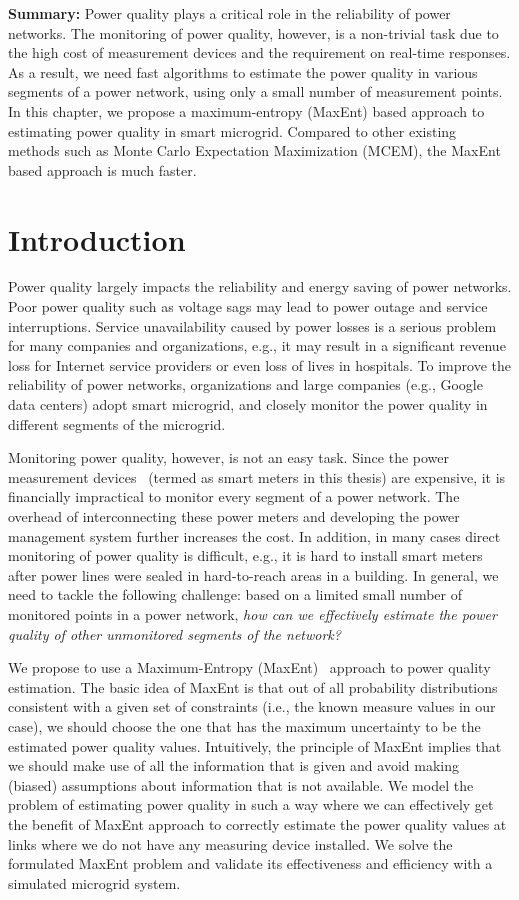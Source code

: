 \label{chap:PQEstimation}
\small
\textbf{Summary:} Power quality plays a critical role in the reliability of power networks. The monitoring of power quality, however, is a non-trivial task due to the high cost of measurement devices and the requirement on real-time responses. As a result, we need fast algorithms to estimate the power quality in various segments of a power network, using only a small number of measurement points. In this chapter, we propose a maximum-entropy (MaxEnt) based approach to estimating power quality in smart microgrid. Compared to other existing methods such as Monte Carlo Expectation Maximization (MCEM), the MaxEnt based approach is much faster.

\normalsize
\section{Introduction}
Power quality largely impacts the reliability and energy saving of power networks. Poor power quality such as voltage sags may lead to power outage and service interruptions. Service unavailability caused by power losses is a serious problem for many companies and organizations, e.g., it may result in a significant revenue loss for Internet service providers or even loss of lives in hospitals. To improve the reliability of power networks, organizations and large companies (e.g., Google data centers) adopt smart microgrid, and closely monitor the power quality in different segments of the microgrid.

Monitoring power quality, however, is not an easy task. Since the power measurement devices~\cite{fluke_meter}\cite{schneider_meter} (termed as smart meters in this thesis) are expensive, it is financially impractical to monitor every segment of a power network. The overhead of interconnecting these power meters and developing the power management system further increases the cost. In addition, in many cases direct monitoring of power quality is difficult, e.g., it is hard to install smart meters after power lines were sealed in hard-to-reach areas in a building. In general, we need to tackle the following challenge: based on a limited small number of monitored points in a power network, \textit{how can we effectively estimate the power quality of other unmonitored segments of the network?} 

We propose to use a Maximum-Entropy (MaxEnt)~\cite{maxent} approach to power quality estimation. The basic idea of MaxEnt is that out of all probability distributions consistent with a given set of constraints (i.e., the known measure values in our case), we should choose the one that has the maximum uncertainty to be the estimated power quality values. Intuitively, the principle of MaxEnt implies that we should make use of all the information that is given and avoid making (biased) assumptions about information that is not available. We model the problem of estimating power quality in such a way where we can effectively get the benefit of MaxEnt approach to correctly estimate the power quality values at links where we do not have any measuring device installed. We solve the formulated MaxEnt problem and validate its effectiveness and efficiency with a simulated microgrid system.

